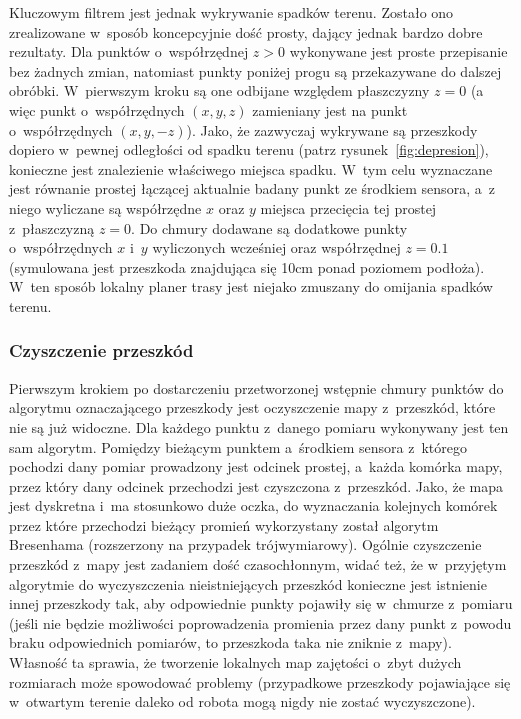 Kluczowym filtrem jest jednak wykrywanie spadków terenu. Zostało ono zrealizowane
w~sposób koncepcyjnie dość prosty, dający jednak bardzo dobre rezultaty. Dla punktów
o~współrzędnej $z>0$ wykonywane
jest proste przepisanie bez żadnych zmian, natomiast punkty poniżej progu są przekazywane
do dalszej obróbki. W~pierwszym kroku są one odbijane względem płaszczyzny $z=0$
(a więc punkt o~współrzędnych $(x, y, z)$ zamieniany jest na punkt o~współrzędnych
$(x, y, -z)$). Jako, że zazwyczaj wykrywane są przeszkody dopiero w~pewnej
odległości od spadku terenu (patrz rysunek~\ref{fig:depresion}), konieczne jest
znalezienie właściwego miejsca spadku. W~tym celu wyznaczane jest równanie prostej
łączącej aktualnie badany punkt ze środkiem sensora, a~z niego wyliczane są współrzędne
$x$ oraz $y$ miejsca przecięcia tej prostej z~płaszczyzną $z=0$. Do chmury dodawane
są dodatkowe punkty o~współrzędnych $x$ i~$y$ wyliczonych wcześniej oraz współrzędnej
$z=0.1$ (symulowana jest przeszkoda znajdująca się 10cm ponad poziomem podłoża).
W~ten sposób lokalny planer trasy jest niejako zmuszany do omijania spadków terenu.

\subsubsection{Czyszczenie przeszkód}

Pierwszym krokiem po dostarczeniu przetworzonej wstępnie chmury punktów do algorytmu
oznaczającego przeszkody jest oczyszczenie mapy z~przeszkód, które nie są już widoczne.
Dla każdego punktu z~danego pomiaru wykonywany jest ten sam algorytm. Pomiędzy
bieżącym punktem a~środkiem sensora z~którego pochodzi dany pomiar prowadzony jest
odcinek prostej, a~każda komórka mapy, przez który dany odcinek przechodzi jest
czyszczona z~przeszkód. Jako, że mapa jest dyskretna i~ma stosunkowo duże oczka,
do wyznaczania kolejnych komórek przez które przechodzi bieżący promień wykorzystany
został algorytm Bresenhama (rozszerzony na przypadek trójwymiarowy). Ogólnie czyszczenie
przeszkód z~mapy jest zadaniem dość czasochłonnym, widać też, że w~przyjętym algorytmie
do wyczyszczenia nieistniejących przeszkód konieczne jest istnienie innej przeszkody
tak, aby odpowiednie punkty pojawiły się w~chmurze z~pomiaru (jeśli nie będzie możliwości
poprowadzenia promienia przez dany punkt z~powodu braku odpowiednich pomiarów, to
przeszkoda taka nie zniknie z~mapy). Własność ta sprawia, że tworzenie lokalnych
map zajętości o~zbyt dużych rozmiarach może spowodować problemy (przypadkowe przeszkody
pojawiające się w~otwartym terenie daleko od robota mogą nigdy nie zostać wyczyszczone).

